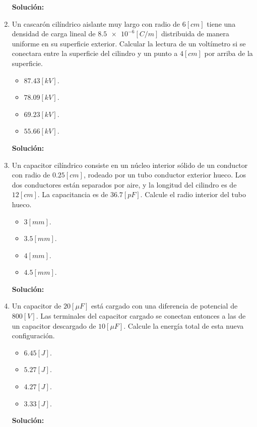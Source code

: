 \documentclass[letter,11pt]{article}
\begin{document}
\begin{enumerate}
\textbf{Solución:}

\item Un cascarón cilíndrico aislante muy largo con radio de $6 [cm]$ tiene una
densidad de carga lineal de $\num{8.5e-6} [C/m]$ distribuida de manera uniforme
en su superficie exterior. Calcular la lectura de un voltímetro si se conectara
entre la superficie del cilindro y un punto a $4 [cm]$ por arriba de la
superficie.

\begin{itemize}
    \item $87.43 [kV]$.
    \item $78.09 [kV]$.
    \item $69.23 [kV]$.
    \item $55.66 [kV]$.
\end{itemize}

\textbf{Solución:}

\item Un capacitor cilíndrico consiste en un núcleo interior sólido de un
conductor con radio de $0.25 [cm]$, rodeado por un tubo conductor exterior
hueco. Los dos conductores están separados por aire, y la longitud del cilindro
es de $12 [cm]$. La capacitancia es de $36.7 [pF]$. Calcule el radio interior
del tubo hueco.

\begin{itemize}
    \item $3 [mm]$.
    \item $3.5 [mm]$.
    \item $4 [mm]$.
    \item $4.5 [mm]$.
\end{itemize}

\textbf{Solución:}

\item Un capacitor de $20 [\mu F]$ está cargado con una diferencia de potencial
de $800 [V]$. Las terminales del capacitor cargado se conectan entonces a las de
un capacitor descargado de $10 [\mu F]$. Calcule la energía total de esta nueva
configuración.

\begin{itemize}
    \item $6.45 [J]$.
    \item $5.27 [J]$.
    \item $4.27 [J]$.
    \item $3.33 [J]$.
\end{itemize}

\textbf{Solución:}

\end{enumerate}
\end{document}
